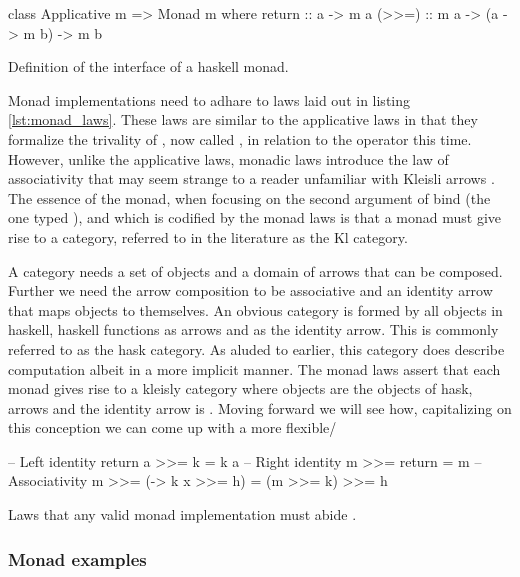 \begin{code}
\begin{haskellcode}
class Applicative m => Monad m where
  return :: a -> m a
  (>>=) :: m a -> (a -> m b) -> m b
\end{haskellcode}
\label{lst:monad_def}
\caption{Definition of the interface of a haskell monad.}
\end{code}

Monad implementations need to adhare to laws laid out in listing
\ref{lst:monad_laws}. These laws are similar to the applicative laws
in that they formalize the trivality of , now called
, in relation to the  operator this
time. However, unlike the applicative laws, monadic laws introduce the
law of associativity that may seem strange to a reader unfamiliar with
Kleisli arrows \cite{dawsonCompoundMonadsKleisli2007}. The essence of
the monad, when focusing on the second argument of bind (the one typed
), and which is codified by the monad laws is that a
monad  must give rise to a category, referred to in the
literature as the Kl category.

A category needs a set of objects and a domain of arrows that can be
composed. Further we need the arrow composition to be associative and
an identity arrow that maps objects to themselves. An obvious category
is formed by all objects in haskell, haskell functions as arrows and
 as the identity arrow. This is commonly referred to as
the hask category. As aluded to earlier, this category does describe
computation albeit in a more implicit manner. The monad laws assert
that each monad gives rise to a kleisly category where objects are the
objects of hask, arrows  and the identity arrow is
. Moving forward we will see how, capitalizing on this
conception we can come up with a more flexible/

\begin{code}
\begin{haskellcode}
-- Left identity
return a >>= k = k a
-- Right identity
m >>= return = m
-- Associativity
m >>= (\x -> k x >>= h) = (m >>= k) >>= h
\end{haskellcode}
\label{lst:monad_laws}
\caption{Laws that any valid monad implementation must abide
  \cite{yorgeyTypeclassopedia2009}.}
\end{code}

\subsubsection{Monad examples}

